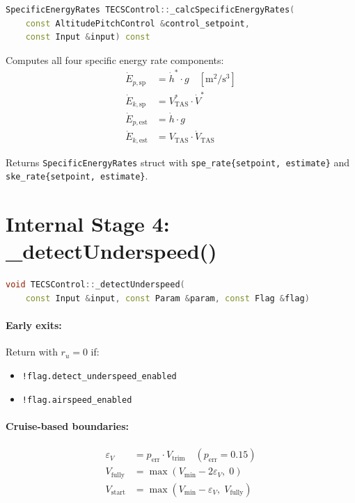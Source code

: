 \documentclass[12pt,a4paper]{article}
\begin{document}
\begin{lstlisting}[language=C++]
SpecificEnergyRates TECSControl::_calcSpecificEnergyRates(
    const AltitudePitchControl &control_setpoint,
    const Input &input) const
\end{lstlisting}

Computes all four specific energy rate components:
\begin{align}
  \dot{E}_{p,\text{sp}}  &= \dot{h}^* \cdot g \quad [\text{m}^2/\text{s}^3] \\
  \dot{E}_{k,\text{sp}}  &= V^*_{\text{TAS}} \cdot \dot{V}^* \\
  \dot{E}_{p,\text{est}} &= \dot{h} \cdot g \\
  \dot{E}_{k,\text{est}} &= V_{\text{TAS}} \cdot \dot{V}_{\text{TAS}}
\end{align}

Returns \texttt{SpecificEnergyRates} struct with
\texttt{spe\_rate\{setpoint, estimate\}} and
\texttt{ske\_rate\{setpoint, estimate\}}.

\section{Internal Stage 4: \_detectUnderspeed()}

\begin{lstlisting}[language=C++]
void TECSControl::_detectUnderspeed(
    const Input &input, const Param &param, const Flag &flag)
\end{lstlisting}

\paragraph{Early exits:} Return with $r_u = 0$ if:
\begin{itemize}
  \item \texttt{!flag.detect\_underspeed\_enabled}
  \item \texttt{!flag.airspeed\_enabled}
\end{itemize}

\paragraph{Cruise-based boundaries:}
\begin{align}
  \varepsilon_V &= p_{\text{err}} \cdot V_{\text{trim}} \quad (p_{\text{err}} = 0.15) \\
  V_{\text{fully}} &= \max(V_{\min} - 2\varepsilon_V,\;0) \\
  V_{\text{start}} &= \max(V_{\min} - \varepsilon_V,\;V_{\text{fully}})
\end{align}
\end{document}
